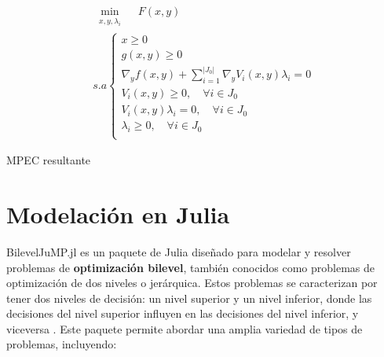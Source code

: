 		\begin{table}[H]

		\[\begin{array}{l}
			\underset{\substack{x, y, \lambda_i}}{\min} \quad F(x, y)\\
			s.a \left\{ \begin{array}{l}
				x \geq 0 \\
				g(x, y) \geq 0\\
				\nabla_{y} f(x, y) + \sum_{i=1}^{|J_{0}|} \nabla_{y} V_i(x, y) \lambda_i = 0 \\
				V_i(x, y) \geq 0, \quad \forall i \in J_{0} \\
				V_i(x, y)\lambda_i = 0, \quad \forall i \in J_{0} \\
				\lambda_i \geq 0, \quad \forall i \in J_{0}\\
			\end{array}\right.
		\end{array}\]
		\caption*{MPEC resultante}
		\end{table}

\section{Modelación en Julia}
BilevelJuMP.jl es un paquete de Julia diseñado para modelar y resolver problemas de \textbf{optimización bilevel}, también conocidos como problemas de optimización de dos niveles o jerárquica. Estos problemas se caracterizan por tener dos niveles de decisión: un nivel superior y un nivel inferior, donde las decisiones del nivel superior influyen en las decisiones del nivel inferior, y viceversa \cite{BilevelJump}.
Este paquete permite abordar una amplia variedad de tipos de problemas, incluyendo:

